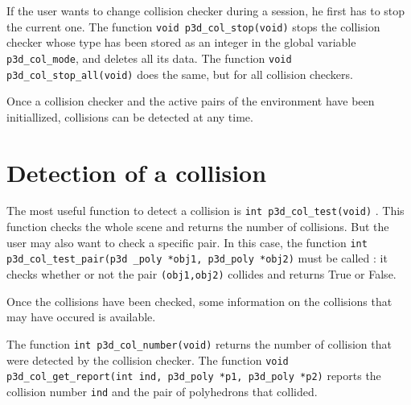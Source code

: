 


If the user wants to change collision checker during a session, he
first has to stop the current one. The function {\tt void
p3d\_col\_stop(void)}  stops the collision 
checker whose type has been
stored as an integer in the global variable {\tt p3d\_col\_mode}, and
deletes all its data. The function {\tt void
p3d\_col\_stop\_all(void)}  does the same,
but for all collision checkers.

Once a collision checker and the active pairs of the environment have
been initiallized, collisions can be detected at any time.

\section{Detection of a collision}

The most useful function to detect a collision is {\tt int
p3d\_col\_test(void)} . This function checks 
the whole scene and
returns the number of collisions. But the user may also want to check
a specific pair. In this case, the function {\tt int
p3d\_col\_test\_pair(p3d \_poly *obj1, p3d\_poly *obj2)}
 must be called :
it checks whether or not the pair {\tt (obj1,obj2)} collides and returns True
or False.

Once the collisions have been checked, some information on the
collisions that may have occured is available. 

The function {\tt int p3d\_col\_number(void)} 
returns the number of collision that were detected by the collision
checker. The function {\tt void p3d\_col\_get\_report(int ind,
p3d\_poly *p1, p3d\_poly *p2)}  reports
the collision number {\tt ind} and the pair of polyhedrons that collided.



